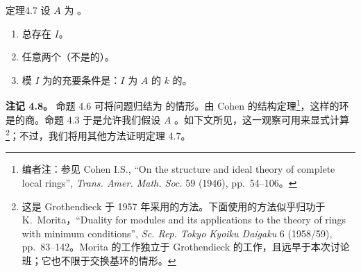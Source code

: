 \begin{SGAresult}{定理}{4.7}
设 $A$ 为 。
\begin{enumerate}
\item[a)] 总存在 $I$。
\item[b)] 任意两个（不是的）。
\item[c)] 模 $I$ 为的充要条件是：$I$ 为 $A$ 的 $k$ 的。
\end{enumerate}
\end{SGAresult}
\textbf{注记 4.8。} 命题 4.6 可将问题归结为 的情形。由 Cohen 的结构定理\footnote[3]{编者注：参见 Cohen I.S., ``On the structure and ideal theory of complete local rings'', \emph{Trans. Amer. Math. Soc.} 59 (1946), pp.~54--106。}，这样的环是的商。命题 4.3 于是允许我们假设 $A$ 。如下文所见，这一观察可用来显式计算\begingroup\renewcommand{\thefootnote}{*}\footnote[1]{这是 Grothendieck 于 1957 年采用的方法。下面使用的方法似乎归功于 K.~Morita，``Duality for modules and its applications to the theory of rings with minimum conditions'', \emph{Sc. Rep. Tokyo Kyoiku Daigaku} 6 (1958/59), pp.~83--142。Morita 的工作独立于 Grothendieck 的工作，且远早于本次讨论班；它也不限于交换基环的情形。}\endgroup{}；不过，我们将用其他方法证明定理 4.7。

